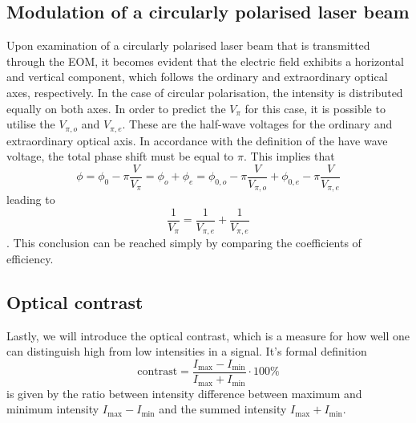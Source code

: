 \subsection{Modulation of a circularly polarised laser beam}

Upon examination of a circularly polarised laser beam that is transmitted through the EOM, it becomes evident that the electric field exhibits a horizontal and vertical component, which follows the ordinary and extraordinary optical axes, respectively. In the case of circular polarisation, the intensity is distributed equally on both axes. In order to predict the $V_\pi$ for this case, it is possible to utilise the $V_{\pi,o}$ and $V_{\pi, e}$. These are the half-wave voltages for the ordinary and extraordinary optical axis. In accordance with the definition of the have wave voltage, the total phase shift must be equal to $\pi$. This implies that  
$$ \phi = \phi_0-\pi\frac{V}{V_\pi}=\phi_o+\phi_e=\phi_{0,o}-\pi\frac{V}{V_{\pi,o}}+\phi_{0,e}-\pi\frac{V}{V_{\pi,e}}$$
leading to 
$$\frac{1}{V_\pi}=\frac{1}{V_{\pi,e}}+\frac{1}{V_{\pi,e}}$$ \label{EQ:VPI}. 
This conclusion can be reached simply by comparing the coefficients of efficiency.

\subsection{Optical contrast}
Lastly, we will introduce the optical contrast, which is a measure for how well one can distinguish high from low intensities in a signal. It's formal definition
\begin{equation}\label{eqn:contrast}
	\mathrm{contrast} = \frac{I_{\mathrm{max}} - I_{\mathrm{min}}}{I_{\mathrm{max}} + I_{\mathrm{min}}} \cdot 100 \%
\end{equation}
is given by the ratio between intensity difference between maximum and minimum intensity $I_{\mathrm{max}} - I_{\mathrm{min}}$ and the summed intensity $I_{\mathrm{max}} + I_{\mathrm{min}}$.


